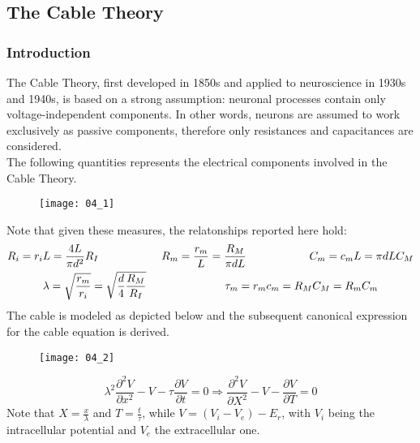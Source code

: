\subsection{The Cable Theory}
\subsubsection{Introduction}
The Cable Theory, first developed in 1850s and applied to neuroscience in 1930s and 1940s,
is based on a strong assumption: neuronal processes contain only voltage-independent
components. In other words, neurons are assumed to work exclusively as passive components,
therefore only resistances and capacitances are considered.\\
The following quantities represents the electrical components involved in the Cable Theory.
\begin{figure}[H]
    \texttt{[image: 04\_1]}
    \centering
\end{figure}
Note that given these measures, the relatonships reported here hold:
\begin{gather*}
    R_{i}=r_{i}L=\frac{4L}{\pi{d^2}}R_{I}
    \hspace{2cm}
    R_{m}=\frac{r_{m}}{L}=\frac{R_{M}}{\pi{dL}}
    \hspace{2cm}
    C_{m}=c_{m}L=\pi{dLC_{M}}\\
    \lambda=\sqrt{\frac{r_{m}}{r_{i}}}=\sqrt{\frac{d}{4}\frac{R_{M}}{R_{I}}}
    \hspace{2.5cm}
    \tau_{m}=r_{m}c_{m}=R_{M}C_{M}=R_{m}C_{m}
\end{gather*}
The cable is modeled as depicted below and the subsequent canonical expression for
the cable equation is derived.
\begin{figure}[H]
    \texttt{[image: 04\_2]}
    \centering
\end{figure}
\begin{equation*}
    \lambda^{2}\frac{\partial^{2}V}{\partial{x^{2}}}-V-\tau{\frac{\partial{V}}{\partial{t}}}=0
    \Rightarrow
    \frac{\partial^{2}V}{\partial{X^{2}}}-V-\frac{\partial{V}}{\partial{T}}=0
\end{equation*}
Note that \(X=\frac{x}{\lambda}\) and \(T=\frac{t}{\tau}\), while \(V=(V_{i}-V_{e})-E_{r}\), with
\(V_i\) being the intracellular potential and \(V_e\) the extracellular one.
